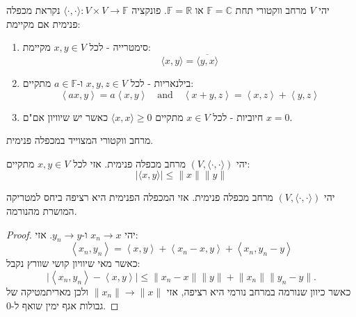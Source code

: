 \documentclass{tstextbook}
\begin{document}
\begin{definition}
יהי \(V\) מרחב ווקטורי תחת \(\mathbb{F}=\mathbb{C}\) או \(\mathbb{F}=\mathbb{R}\). פונקציה \(\langle \cdot,\cdot \rangle:V\times V\to \mathbb{F}\) נקראת מכפלה פנימית אם מקיימת:

  \begin{enumerate}
    \item סימטרייה - לכל \(x,y \in V\) מקיימת: 
$$\big\langle x,y\big\rangle={\overline{{\big\langle y,x\big\rangle}}}$$


    \item בילנאריות - לכל \(x,y,z \in V\) ו-\(a \in \mathbb{F}\) מתקיים: 
$$\left\langle a x,y\right\rangle=a\left\langle x,y\right\rangle\quad \text{and}\quad\left\langle x+y,z\right\rangle=\left\langle x,z\right\rangle+\left\langle y,z\right\rangle$$


    \item חיוביות - לכל \(x \in V\) מתקיים \(\langle x,x \rangle\geq 0\) כאשר יש שיוויון אם"ם \(x=0\). 


  \end{enumerate}
\end{definition}
\begin{definition}
מרחב ווקטורי המצוייד במכפלה פנימית.

\end{definition}
\begin{proposition}
יהי \((V,\langle \cdot,\cdot \rangle)\) מרחב מכפלה פנימית. אזי לכל \(x,y \in V\) מתקיים:
$$\lvert \langle x,y \rangle  \rvert \leq  \lVert x \rVert \lVert y \rVert $$

\end{proposition}
\begin{proposition}
יהי \((V,\langle \cdot,\cdot \rangle)\) מרחב מכפלה פנימית. אזי המכפלה הפנימית היא רציפה ביחס למטריקה המושרת מהנורמה.

\end{proposition}
\begin{proof}
יהי \(x_{n}\to x\) ו-\(y_{n}\to y\). אזי:
$$\left\langle x_{n},y_{n}\right\rangle=\left\langle x,y\right\rangle+\left\langle x_{n}-x,y\right\rangle+\left\langle x_{n},y_{n}-y\right\rangle$$
כאשר מאי שיוויון קושי שוורץ נקבל:
$$\big|\left\langle x_{n},y_{n}\right\rangle-\left\langle x,y\right\rangle\big|\leq\big\|x_{n}-x\big\|\big\|y\big\|+\big\|x_{n}\big\|\big\|y_{n}-y\big\|.$$
כאשר כיוון שנורמה במרחב נורמי היא רציפה, אזי \(\lVert x_{n} \rVert\to \lVert x \rVert\) ולכן מאריתמטיקה של גבולות אגף ימין שואף ל-0.

\end{proof}
\end{document}

